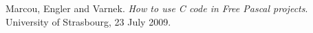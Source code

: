 \documentclass[10pt,a4paper]{article}
\begin{document}
%
%
%
%
%
%
%
%

\begin{thebibliography}{1}

 Marcou, Engler and Varnek. {\em How to use C code in Free Pascal projects}. University of Strasbourg, 23 July 2009.

\end{thebibliography}
\end{document}
